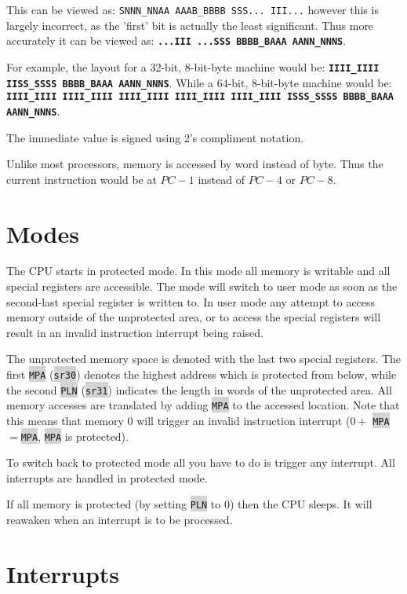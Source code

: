 \documentclass{article}
\newcommand{\labcode}[1]{\colorbox{lightgray}{\lstinline[language=lab]{#1}}}
\begin{document}
This can be viewed as: \texttt{SNNN\_NNAA AAAB\_BBBB SSS... III...} however this
is largely incorrect, as the 'first' bit is actually the least significant. Thus
more accurately it can be viewed as:
\texttt{\textbf{...III ...SSS BBBB\_BAAA AANN\_NNNS}}.

For example, the layout for a 32-bit, 8-bit-byte machine would be:
\texttt{\textbf{IIII\_IIII IISS\_SSSS BBBB\_BAAA AANN\_NNNS}}. While a 64-bit,
8-bit-byte machine would be:
\texttt{\textbf{IIII\_IIII IIII\_IIII IIII\_IIII IIII\_IIII IIII\_IIII ISSS\_SSSS BBBB\_BAAA AANN\_NNNS}}.

The immediate value is signed using 2's compliment notation.

Unlike most processors, memory is accessed by word instead of byte. Thus the
current instruction would be at $PC-1$ instead of $PC-4$ or $PC-8$.

\section{Modes}

The CPU starts in protected mode. In this mode all memory is writable and all
special registers are accessible. The mode will switch to user mode as soon as
the second-last special register is written to. In user mode any attempt to
access memory outside of the unprotected area, or to access the special
registers will result in an invalid instruction interrupt being raised.

The unprotected memory space is denoted with the last two special registers. The
first \labcode{MPA} (\labcode{sr30}) denotes the highest address which is
protected from below, while the second \labcode{PLN} (\labcode{sr31}) indicates
the length in words of the unprotected area. All memory accesses are translated
by adding \labcode{MPA} to the accessed location. Note that this means that
memory 0 will trigger an invalid instruction interrupt ($0 + $
\labcode{MPA}$=$\labcode{MPA}, \labcode{MPA} is protected).

To switch back to protected mode all you have to do is trigger any interrupt.
All interrupts are handled in protected mode.

If all memory is protected (by setting \labcode{PLN} to 0) then the CPU sleeps.
It will reawaken when an interrupt is to be processed.

\section{Interrupts}
\end{document}

